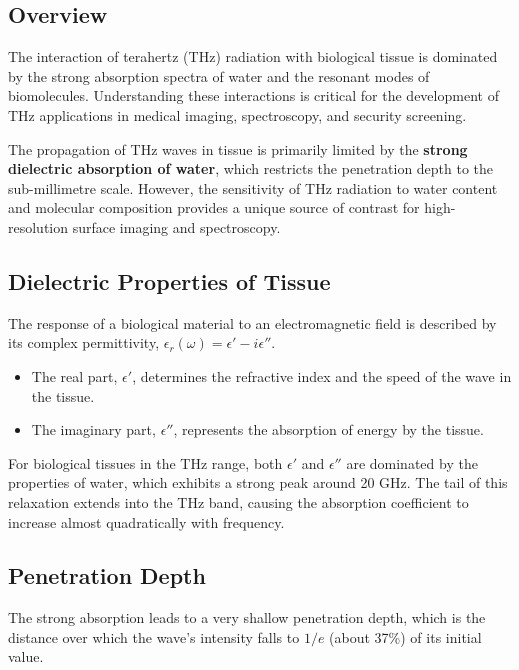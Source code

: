 \subsection{Overview}

The interaction of terahertz (THz) radiation with biological tissue is dominated by the strong absorption spectra of water and the resonant modes of biomolecules. Understanding these interactions is critical for the development of THz applications in medical imaging, spectroscopy, and security screening.

\begin{keyconcept}
    The propagation of THz waves in tissue is primarily limited by the \textbf{strong dielectric absorption of water}, which restricts the penetration depth to the sub-millimetre scale. However, the sensitivity of THz radiation to water content and molecular composition provides a unique source of contrast for high-resolution surface imaging and spectroscopy.
\end{keyconcept}


\subsection{Dielectric Properties of Tissue}

The response of a biological material to an electromagnetic field is described by its complex permittivity, $\epsilon_r(\omega) = \epsilon' - i\epsilon''$.
\begin{itemize}
    \item The real part, $\epsilon'$, determines the refractive index and the speed of the wave in the tissue.
    \item The imaginary part, $\epsilon''$, represents the absorption of energy by the tissue.
\end{itemize}
For biological tissues in the THz range, both $\epsilon'$ and $\epsilon''$ are dominated by the properties of water, which exhibits a strong  peak around 20 GHz. The tail of this relaxation extends into the THz band, causing the absorption coefficient to increase almost quadratically with frequency.


\subsection{Penetration Depth}

The strong absorption leads to a very shallow penetration depth, which is the distance over which the wave's intensity falls to $1/e$ (about 37\%) of its initial value.

